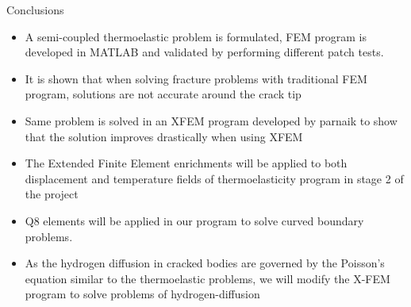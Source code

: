 \documentclass{beamer}
\begin{document}
\begin{frame}[t,fragile]{Conclusions}
    \vspace{-.2cm}
    \footnotesize
\begin{itemize}
    \item A semi-coupled thermoelastic problem is formulated, FEM program is developed in MATLAB and validated by performing different patch tests.
    \item It is shown that when solving fracture problems with traditional FEM program, solutions are not accurate around the crack tip
    \item Same problem is solved in an XFEM program developed by parnaik to show that the solution improves drastically when using XFEM
    \item The Extended Finite Element enrichments will be applied to both displacement and temperature fields of thermoelasticity program in stage 2 of the project  
    \item Q8 elements will be applied in our program to solve curved boundary problems. 
    \item As the hydrogen diffusion in cracked bodies are governed by the Poisson's equation similar to the thermoelastic problems, we will modify the X-FEM program to solve problems of hydrogen-diffusion 
    \end{itemize}
\end{frame}
\end{document}
